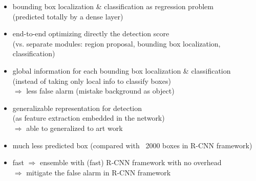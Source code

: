 \begin{itemize}
\begin{itemize}
		\begin{itemize}
		\item bounding box localization \& classification as regression problem \\
		(predicted totally by a dense layer)
		\item end-to-end optimizing directly the detection score \\
		(vs. separate modules: region proposal, bounding box localization, classification)
		\item global information for each bounding box localization \& classification \\
		(instead of taking only local info to classify boxes) \\
		$\Rightarrow$ less false alarm (mistake background as object)
		\item generalizable representation for detection \\
		(as feature extraction embedded in the network) \\
		$\Rightarrow$ able to generalized to art work
		\item much less predicted box (compared with ~2000 boxes in R-CNN framework)
		\item fast $\Rightarrow$ ensemble with (fast) R-CNN framework with no overhead \\
		$\Rightarrow$ mitigate the false alarm in R-CNN framework
		\end{itemize}
	\end{itemize}


\end{itemize}
